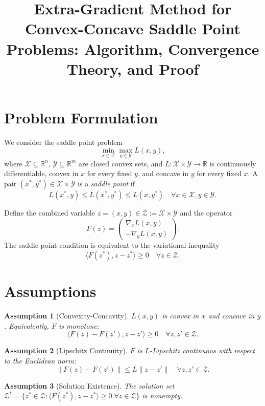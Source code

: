 \documentclass{article}
\theoremstyle{plain}
\newtheorem{assumption}{Assumption}
\theoremstyle{definition}
\begin{document}
\title{Extra-Gradient Method for Convex-Concave Saddle Point Problems: Algorithm, Convergence Theory, and Proof}
\author{}
\date{}
\maketitle

\section{Problem Formulation}
We consider the saddle point problem
\begin{equation}
\min_{x \in \mathcal{X}} \max_{y \in \mathcal{Y}} L(x,y),
\end{equation}
where $\mathcal{X} \subseteq \mathbb{R}^n$, $\mathcal{Y} \subseteq \mathbb{R}^m$ are closed convex sets, and $L: \mathcal{X} \times \mathcal{Y} \to \mathbb{R}$ is continuously differentiable, convex in $x$ for every fixed $y$, and concave in $y$ for every fixed $x$. A pair $(x^*,y^*) \in \mathcal{X} \times \mathcal{Y}$ is a \emph{saddle point} if
\[
L(x^*,y) \le L(x^*,y^*) \le L(x,y^*) \quad \forall x\in\mathcal{X}, y\in\mathcal{Y}.
\]

Define the combined variable $z = (x,y) \in \mathcal{Z} := \mathcal{X} \times \mathcal{Y}$ and the operator
\[
F(z) = \begin{pmatrix} \nabla_x L(x,y) \\ -\nabla_y L(x,y) \end{pmatrix}.
\]
The saddle point condition is equivalent to the variational inequality
\[
\langle F(z^*), z - z^* \rangle \ge 0 \quad \forall z \in \mathcal{Z}.
\]

\section{Assumptions}
\begin{assumption}[Convexity-Concavity] \label{ass:cvx}
$L(x,y)$ is convex in $x$ and concave in $y$. Equivalently, $F$ is monotone:
\[
\langle F(z) - F(z'), z - z' \rangle \ge 0 \quad \forall z,z' \in \mathcal{Z}.
\]
\end{assumption}

\begin{assumption}[Lipschitz Continuity] \label{ass:lip}
$F$ is $L$-Lipschitz continuous with respect to the Euclidean norm:
\[
\|F(z) - F(z')\| \le L \|z - z'\| \quad \forall z,z' \in \mathcal{Z}.
\]
\end{assumption}

\begin{assumption}[Solution Existence] \label{ass:sol}
The solution set $\mathcal{Z}^* = \{z^* \in \mathcal{Z} : \langle F(z^*), z - z^* \rangle \ge 0 \; \forall z \in \mathcal{Z}\}$ is nonempty.
\end{assumption}
\end{document}
